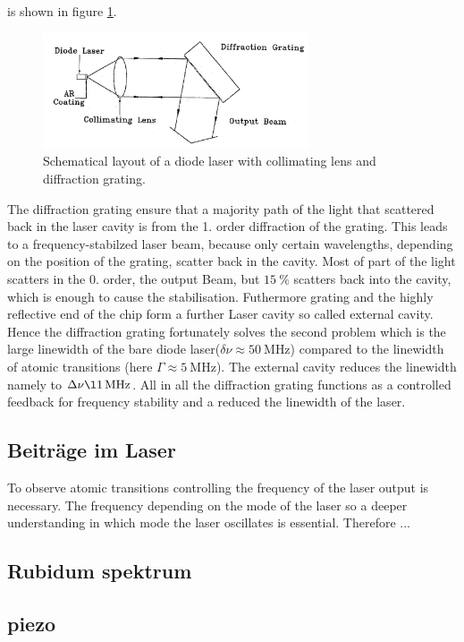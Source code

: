 is shown in figure \ref{fig:aufbau}.
\begin{figure}
  \centering
  \includegraphics[width=0.7\textwidth]{aufbau.png}
  \caption{Schematical layout of a diode laser with collimating lens and diffraction grating.\cite{V61}}
  \label{fig:aufbau}
\end{figure}

The diffraction grating ensure that a majority path of
the light that scattered back in the laser cavity is from the  1. order
diffraction of the grating. This leads to
a frequency-stabilzed laser beam, because only certain wavelengths,
depending on the position
of the grating, scatter back in the cavity.
Most of part of the light scatters in the 0. order,
the output Beam, but $\SI{15}{\percent}$ scatters back into
the cavity, which is enough to cause the stabilisation.
Futhermore grating and the highly reflective end of the chip form a
further Laser cavity
so called external cavity.
Hence the diffraction grating fortunately solves the second
problem which is the large linewidth of the bare
diode laser($\delta \nu \approx \SI{50}{\mega\hertz}$)
compared to the linewidth of atomic transitions
(here $\Gamma \approx \SI{5}{\mega\hertz}$).
The external cavity
reduces the linewidth namely to $\Delta\nu\l \SI{1}{\mega\hertz}$.
All in all the diffraction grating
functions as a controlled feedback for frequency stability
and a reduced the linewidth of the laser.

\subsection{Beiträge im Laser}
\label{subsec:}
To observe atomic transitions controlling
the frequency of the laser output is necessary.
The frequency depending on the mode of the laser
so a deeper understanding in which mode the laser
oscillates is essential.
Therefore ...


\subsection{Rubidum spektrum}
\label{subsec:}


\subsection{piezo}
\label{subsec:}
